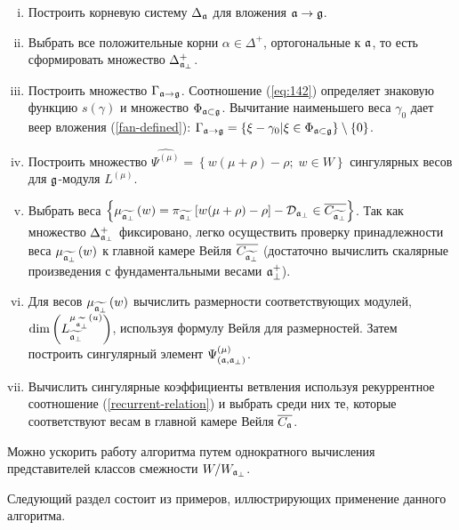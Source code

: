 \begin{enumerate}[(i)]
\item Построить корневую систему $\Delta _{\mathfrak{a}}$ для вложения $\mathfrak{a}\rightarrow \mathfrak{g}$.

\item Выбрать все положительные корни $\alpha \in \Delta ^{+}$, ортогональные к  $\mathfrak{a}$, то есть сформировать множество $\Delta_{\mathfrak{a}_{\perp} }^{+}$.

\item Построить множество $\Gamma _{\mathfrak{a}\rightarrow \mathfrak{g}}$. Соотношение  (\ref{eq:142}) определяет знаковую функцию $s(\gamma)$ и множество $\Phi_{\mathfrak{a}\subset \mathfrak{g}}$. Вычитание наименьшего веса $\gamma_0$ дает веер вложения (\ref{fan-defined}):
 $\Gamma _{\mathfrak{a}\rightarrow \mathfrak{g}}=\left\{ \xi -\gamma _{0}|\xi \in \Phi _{\mathfrak{a}\subset \mathfrak{g}}\right\} \setminus \left\{ 0\right\}$.

\item Построить множество $\widehat{\Psi ^{(\mu )}}=\left\{ w (\mu +\rho
)-\rho ;\;w \in W\right\} $ сингулярных весов для  $\mathfrak{g}$-модуля $L^{(\mu )}$.

\item Выбрать веса $\left\{ \mu _{\widetilde{\mathfrak{a}_{\perp}}}\left( w\right) =\pi _{\widetilde{\mathfrak{a}_{\perp}}}\left[ w(\mu +\rho
)-\rho \right] -\mathcal{D}_{\mathfrak{a}_{\perp}}\in \overline{C_{\widetilde{\mathfrak{a}_{\perp}}}}\right\} $. Так как множество  $\Delta_{\mathfrak{a}_{\perp} }^{+}$ фиксировано, легко осуществить проверку принадлежности веса $\mu _{\widetilde{\mathfrak{a}_{\perp}}}\left( w\right) $ к главной камере Вейля $\overline{C_{\widetilde{\mathfrak{a}_{\perp}}}}$ (достаточно вычислить скалярные произведения с фундаментальными весами $\mathfrak{a}_{\perp}^{+}$).

\item Для весов $\mu _{\widetilde{\mathfrak{a}_{\perp}}}\left( w\right) $ вычислить размерности соответствующих модулей, $\mathrm{\dim }\left(L_{\widetilde{\mathfrak{a}_{\perp}}}^{\mu _{\widetilde{\mathfrak{a}_{\perp}}}\left( u\right) }\right) $, используя формулу Вейля для размерностей. Затем построить сингулярный элемент $\Psi ^{\left( \mu \right) }_{\left(  \mathfrak{a}, \mathfrak{a}_{\perp} \right)}$.

\item Вычислить сингулярные коэффициенты ветвления используя рекуррентное соотношение (\ref{recurrent-relation}) и выбрать среди них те, которые соответствуют весам в главной камере Вейля $\overline{C_{\mathfrak{a}}}$.
\end{enumerate}

Можно ускорить работу алгоритма путем однократного вычисления представителей классов смежности $W/W_{\mathfrak{a}_{\perp} }$.

Следующий раздел состоит из примеров, иллюстрирующих применение данного алгоритма.

